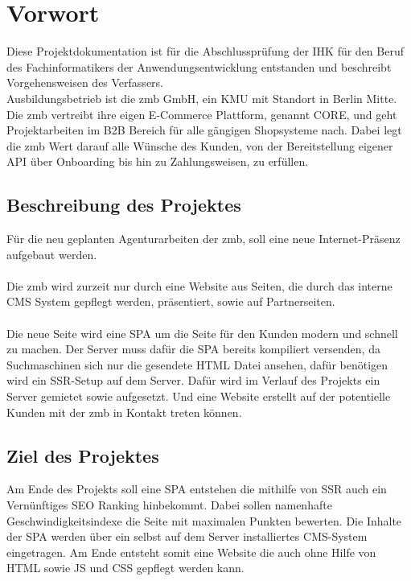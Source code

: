 \documentclass[11pt,a4paper]{article}
\begin{document}
\section{Vorwort}
Diese Projektdokumentation ist für die Abschlussprüfung der IHK für den Beruf des Fachinformatikers der Anwendungsentwicklung entstanden und beschreibt Vorgehensweisen des Verfassers.\\
Ausbildungsbetrieb ist die zmb GmbH, ein KMU mit Standort in Berlin Mitte.
Die zmb vertreibt ihre eigen E-Commerce Plattform, genannt CORE, und geht Projektarbeiten im \acs{B2B} Bereich für alle gängigen Shopsysteme nach.  
Dabei legt die zmb Wert darauf alle Wünsche des Kunden, von der Bereitstellung eigener API über Onboarding bis hin zu Zahlungsweisen, zu erfüllen. 
\subsection{Beschreibung des Projektes}
Für die neu geplanten Agenturarbeiten der zmb, soll eine neue Internet-Präsenz aufgebaut werden.\\\\
Die zmb wird zurzeit nur durch eine Website aus Seiten, die durch das interne CMS System gepflegt werden, präsentiert, sowie auf Partnerseiten.\\\\
Die neue Seite wird eine \acs{SPA} um die Seite für den Kunden modern und schnell zu machen.  
Der Server muss dafür die \acs{SPA} bereits kompiliert versenden, da Suchmaschinen sich nur die gesendete HTML Datei ansehen, dafür benötigen wird ein \acs{SSR}-Setup auf dem Server.
Dafür wird im Verlauf des Projekts ein Server gemietet sowie aufgesetzt. Und eine Website erstellt auf der potentielle Kunden mit der zmb in Kontakt treten können.  
\subsection{Ziel des Projektes}
Am Ende des Projekts soll eine \acs{SPA} entstehen die mithilfe von \acs{SSR} auch ein Vernünftiges SEO Ranking hinbekommt. Dabei sollen namenhafte Geschwindigkeitsindexe die Seite mit maximalen Punkten bewerten.
Die Inhalte der \acs{SPA} werden über ein selbst auf dem Server installiertes CMS-System eingetragen.
Am Ende entsteht somit eine Website die auch ohne Hilfe von HTML sowie JS und CSS gepflegt werden kann.
\end{document}
